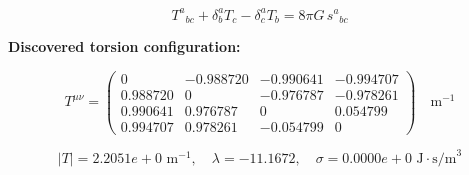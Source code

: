 
\begin{equation}
  T^a{}_{bc} + \delta^a_b T_c - \delta^a_c T_b = 8\pi G \, s^a{}_{bc}
\end{equation}

\textbf{Discovered torsion configuration:}

\begin{equation}
  T^{\mu\nu} = \begin{pmatrix}
    0 & -0.988720 & -0.990641 & -0.994707 \\
    0.988720 & 0 & -0.976787 & -0.978261 \\
    0.990641 & 0.976787 & 0 & 0.054799 \\
    0.994707 & 0.978261 & -0.054799 & 0
  \end{pmatrix} \quad \text{m}^{-1}
\end{equation}

\begin{equation}
  |T| = 2.2051e+0 \text{ m}^{-1}, \quad
  \lambda = -11.1672, \quad
  \sigma = 0.0000e+0 \text{ J}\cdot\text{s/m}^3
\end{equation}